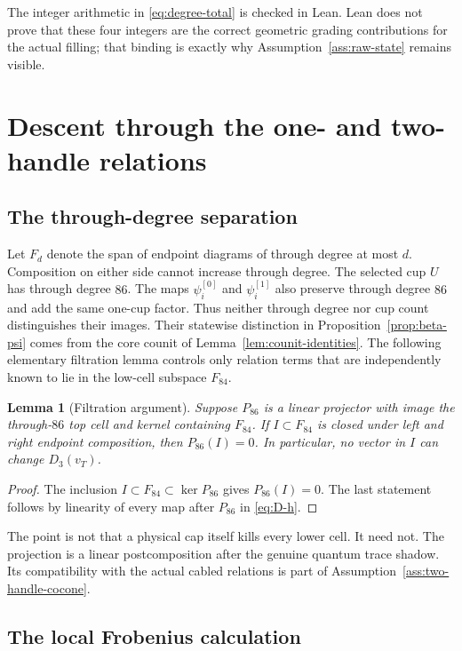 \documentclass[10pt,reqno]{amsart}
\newtheorem{lemma}[theorem]{Lemma}
\theoremstyle{definition}
\theoremstyle{remark}
\begin{document}
The integer arithmetic in \cref{eq:degree-total} is checked in Lean.  Lean
does not prove that these four integers are the correct geometric grading
contributions for the actual filling; that binding is exactly why
Assumption~\ref{ass:raw-state} remains visible.

\section{Descent through the one- and two-handle relations}\label{sec:two-handle-descent}

\subsection{The through-degree separation}

Let $F_d$ denote the span of endpoint diagrams of through degree at most $d$.
Composition on either side cannot increase through degree.  The selected cup
$U$ has through degree $86$.  The maps $\psi_i^{[0]}$ and
$\psi_i^{[1]}$ also preserve through degree $86$ and add the same one-cup
factor.  Thus neither through degree nor cup count distinguishes their images.
Their statewise distinction in Proposition~\ref{prop:beta-psi} comes from the
core counit of Lemma~\ref{lem:counit-identities}.  The following elementary
filtration lemma controls only relation terms that are independently known to
lie in the low-cell subspace $F_{84}$.

\begin{lemma}[Filtration argument]\label{lem:through-filtration}
Suppose $P_{86}$ is a linear projector with image the through-$86$ top cell
and kernel containing $F_{84}$.  If $I\subset F_{84}$ is closed under left and
right endpoint composition, then $P_{86}(I)=0$.  In particular, no vector in
$I$ can change $D_3(v_T)$.
\end{lemma}

\begin{proof}
The inclusion $I\subset F_{84}\subset\ker P_{86}$ gives $P_{86}(I)=0$.
The last statement follows by linearity of every map after $P_{86}$ in
\cref{eq:D-h}.
\end{proof}

The point is not that a physical cap itself kills every lower cell.  It need
not.  The projection is a linear postcomposition after the genuine quantum
trace shadow.  Its compatibility with the actual cabled relations is part of
Assumption~\ref{ass:two-handle-cocone}.

\subsection{The local Frobenius calculation}
\end{document}
